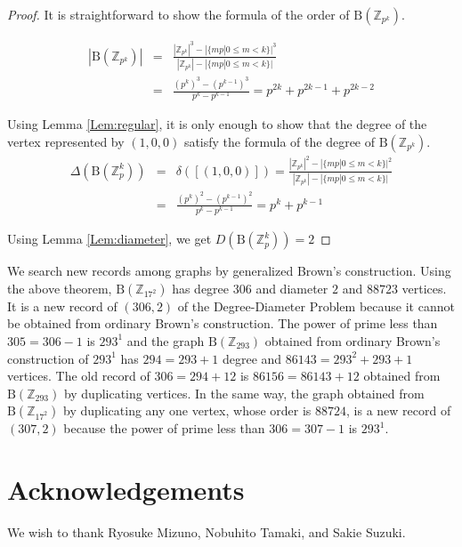 \documentclass{article}
\newcommand{\Z}{\mathbb Z}
\newcommand{\B}{\mathrm{B}}
\begin{document}
\begin{proof}
It is straightforward to show the formula of the order of $\B(\Z_{p^k})$.

\begin{eqnarray*}
|\B(\Z_{p^k})| & = & \frac{|\Z_{p^k}|^3 - |\{ mp | 0 \leq m < k \}|^3}{|\Z_{p^k}|-|\{ mp | 0 \leq m < k \}|} \\ 
& = & \frac{(p^k)^3 - (p^{k-1})^3}{p^k-p^{k-1}} = p^{2k}+p^{2k-1}+p^{2k-2}
\end{eqnarray*}

Using Lemma \ref{Lem:regular}, it is only enough to show that the degree of the vertex represented by $(1,0,0)$ satisfy the formula of the degree of $\B(\Z_{p^k})$. 
\begin{eqnarray*}
\Delta(\B(\Z_p^k)) & = & \delta([(1,0,0)]) = \frac{|\Z_{p^k}|^2 - |\{ mp | 0 \leq m < k \}|^2 }{|\Z_{p^k}|-|\{ mp | 0 \leq m < k \}|} \\
& = & \frac{(p^k)^2 - (p^{k-1})^2}{p^k-p^{k-1}} = p^k + p^{k-1}
\end{eqnarray*}

Using Lemma \ref{Lem:diameter}, we get $D(\B(\Z_p^k)) = 2$

\end{proof}

We search new records among graphs by generalized Brown's construction.
Using the above theorem, $\B(\Z_{17^2})$ has degree $306$ and diameter $2$ and $88723$ vertices.
It is a new record of $(306,2)$ of the Degree-Diameter Problem because it cannot be obtained from ordinary Brown's construction.
The power of prime less than $305=306 - 1$ is $293^1$ and the graph $\B(\Z_{293})$ obtained from ordinary Brown's construction of $293^1$ has $294=293+1$ degree and $86143=293^2+293+1$ vertices.
The old record of $306=294+12$ is $86156=86143+12$ obtained from $\B(\Z_{293})$ by duplicating vertices.
In the same way, the graph obtained from $\B(\Z_{17^2})$ by duplicating any one vertex, whose order is $88724$, is a new record of $(307,2)$ because the power of prime less than $306=307-1$ is $293^1$.

\section{Acknowledgements}
We wish to thank Ryosuke Mizuno, Nobuhito Tamaki, and Sakie Suzuki.



\end{document}
